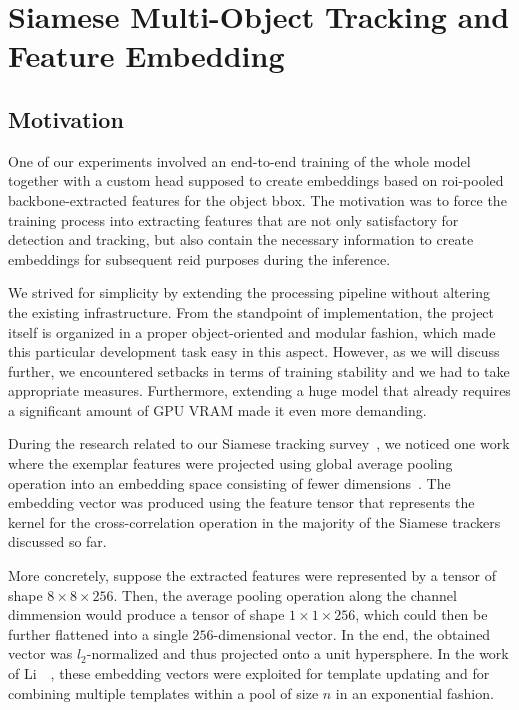 \section{Siamese Multi-Object Tracking and Feature Embedding}
\label{sec:SiamMOTandFeatureEmb}

\subsection{Motivation}

One of our experiments involved an end-to-end training of the whole \siammot{} model together with a custom head supposed to create embeddings based on \gls{roi}-pooled backbone-extracted features for the object \gls{bbox}. The motivation was to force the training process into extracting features that are not only satisfactory for detection and tracking, but also contain the necessary information to create embeddings for subsequent \gls{reid} purposes during the inference.

We strived for simplicity by extending the processing pipeline without altering the existing infrastructure. From the standpoint of implementation, the \siammot{} project itself is organized in a proper object-oriented and modular fashion, which made this particular development task easy in this aspect. However, as we will discuss further, we encountered setbacks in terms of training stability and we had to take appropriate measures. Furthermore, extending a huge model that already requires a significant amount of GPU VRAM made it even more demanding.

During the research related to our Siamese tracking survey~\cite{ondrasovic2021siamese}, we noticed one work where the exemplar features were projected using global average pooling operation into an embedding space consisting of fewer dimensions~\cite{li2020figsiam}. The embedding vector was produced using the feature tensor that represents the kernel for the cross-correlation operation in the majority of the Siamese trackers discussed so far.

More concretely, suppose the extracted features were represented by a tensor of shape $8 \times 8 \times 256$. Then, the average pooling operation along the channel dimmension would produce a tensor of shape $1 \times 1 \times 256$, which could then be further flattened into a single $256$-dimensional vector. In the end, the obtained vector was $l_2$-normalized and thus projected onto a unit hypersphere. In the work of Li~\etal{}~\cite{li2020figsiam}, these embedding vectors were exploited for template updating and for combining multiple templates within a pool of size $n$ in an exponential fashion.

